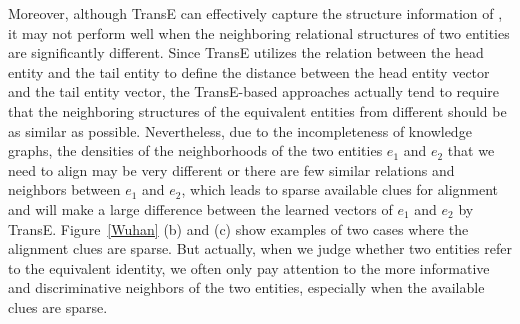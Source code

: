 	Moreover, although TransE can effectively capture the structure information of \KGs, it may not perform well when the neighboring relational structures of two entities are significantly different. Since TransE utilizes the relation between the head entity and the tail entity to define the distance between the head entity vector and the tail entity vector, the TransE-based approaches actually tend to require that the neighboring structures of the equivalent entities from different \KGs should be as similar as possible. Nevertheless, due to the incompleteness of knowledge graphs, the densities of the neighborhoods of the two entities $e_1$ and $e_2$ that we need to align may be very different or there are few similar relations and neighbors between $e_1$ and $e_2$, which leads to sparse available clues for alignment and will make a large difference between the learned vectors of $e_1$ and $e_2$ by TransE. Figure~\ref{Wuhan} (b) and (c) show examples of two cases where the alignment clues are sparse. But actually, when we judge whether two entities refer to the equivalent identity, we often only pay attention to the more informative and discriminative neighbors of the two entities, especially when the available clues are sparse.

